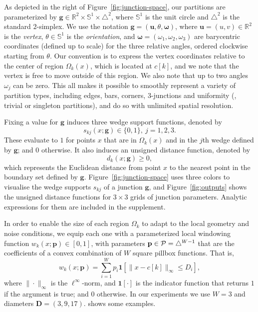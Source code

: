 \documentclass[main.tex]{subfiles}
\begin{document}
As depicted in the right of Figure~\ref{fig:junction-space}, our partitions are parameterized by $\mathbf{g}\in\mathbb{R}^2\times\mathbb{S}^1\times\triangle^{2}$, where $\mathbb{S}^1$ is the unit circle and $\triangle^{2}$ is the standard $2$-simplex. We use the notation $\mathbf{g}=(\boldsymbol{u}, \theta, \boldsymbol{\omega})$, where $\boldsymbol{u}=(u,v)\in \mathbb{R}^2$ is the \emph{vertex}, $\theta\in\mathbb{S}^1$ is the \emph{orientation}, and   $\boldsymbol{\omega}=(\omega_1,\omega_2,\omega_3)$ are barycentric coordinates (defined up to scale) for the three relative angles, ordered clockwise starting from $\theta$. Our convention is to express the vertex coordinates relative to the center of region $\Omega_k(x)$, which is located at $c[k]$, and we note that the vertex is free to move outside of this region. We also note that up to two angles $\omega_j$ can be zero. This all makes it possible to smoothly represent a variety of partition types, including edges, bars, corners, 3-junctions and uniformity (\ie, trivial or singleton partitions), and do so with unlimited spatial resolution. 

Fixing a value for $\mathbf{g}$ induces three wedge support functions, denoted by
\begin{equation}
s_{kj}(x;\mathbf{g})\in\{0,1\},\ j=1, 2, 3.
\end{equation}
These evaluate to $1$ for points $x$ that are in $\Omega_k(x)$ and in the $j$th wedge defined by $\mathbf{g}$; and $0$ otherwise. It also induces an unsigned distance function, denoted by
\begin{equation}
d_{k}(x;\mathbf{g})\ge 0,
\end{equation}
which represents the Euclidean distance from point $x$ to the nearest point in the boundary set defined by $\mathbf{g}$. Figure~\ref{fig:junction-space} uses three colors to visualise the wedge supports $s_{kj}$ of a junction $\mathbf{g}$, and Figure~\ref{fig:outputs} shows the unsigned distance functions for $3\times 3$ grids of junction parameters. Analytic expressions for them are included in the supplement.

In order to enable the size of each region $\Omega_k$ to adapt to the local geometry and noise conditions, we equip each one with a parameterized local windowing function $w_k(x; \mathbf{p})\in[0,1]$, with parameters $\mathbf{p}\in{\cal P}=\triangle^{W-1}$ that are the coefficients of a convex combination of $W$ square pillbox functions. That is,
\begin{equation} \label{eq:windowfnconcrete}
    w_k(x;\mathbf{p}) = \sum_{i=1}^W p_i \mathbf{1}[\|x - c[k]\|_\infty \leq D_i],
\end{equation}
where $\|\cdot\|_{\infty}$ is the $\ell^{\infty}$-norm, and $\mathbf{1}[\cdot]$ is the indicator function that returns $1$ if the argument is true; and $0$ otherwise. In our experiments we use $W=3$ and diameters $\mathbf{D} = (3, 9, 17)$.  shows some examples.
\end{document}
